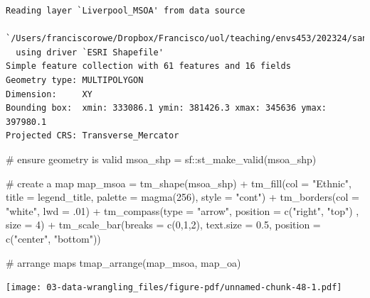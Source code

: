 \documentclass[
  letterpaper,
  DIV=11,
  numbers=noendperiod,
  oneside]{scrreprt}
\newenvironment{Shaded}{\begin{snugshade}}{\end{snugshade}}
\newcommand{\AttributeTok}[1]{\textcolor[rgb]{0.40,0.45,0.13}{#1}}
\newcommand{\CommentTok}[1]{\textcolor[rgb]{0.37,0.37,0.37}{#1}}
\newcommand{\DecValTok}[1]{\textcolor[rgb]{0.68,0.00,0.00}{#1}}
\newcommand{\FloatTok}[1]{\textcolor[rgb]{0.68,0.00,0.00}{#1}}
\newcommand{\FunctionTok}[1]{\textcolor[rgb]{0.28,0.35,0.67}{#1}}
\newcommand{\NormalTok}[1]{\textcolor[rgb]{0.00,0.23,0.31}{#1}}
\newcommand{\OtherTok}[1]{\textcolor[rgb]{0.00,0.23,0.31}{#1}}
\newcommand{\SpecialCharTok}[1]{\textcolor[rgb]{0.37,0.37,0.37}{#1}}
\newcommand{\StringTok}[1]{\textcolor[rgb]{0.13,0.47,0.30}{#1}}
\begin{document}
\begin{verbatim}
Reading layer `Liverpool_MSOA' from data source 
  `/Users/franciscorowe/Dropbox/Francisco/uol/teaching/envs453/202324/san/data/census/Liverpool_MSOA.shp' 
  using driver `ESRI Shapefile'
Simple feature collection with 61 features and 16 fields
Geometry type: MULTIPOLYGON
Dimension:     XY
Bounding box:  xmin: 333086.1 ymin: 381426.3 xmax: 345636 ymax: 397980.1
Projected CRS: Transverse_Mercator
\end{verbatim}

\begin{Shaded}
\begin{Highlighting}[]
\CommentTok{\# ensure geometry is valid}
\NormalTok{msoa\_shp }\OtherTok{=}\NormalTok{ sf}\SpecialCharTok{::}\FunctionTok{st\_make\_valid}\NormalTok{(msoa\_shp)}

\CommentTok{\# create a map}
\NormalTok{map\_msoa }\OtherTok{=} \FunctionTok{tm\_shape}\NormalTok{(msoa\_shp) }\SpecialCharTok{+}
  \FunctionTok{tm\_fill}\NormalTok{(}\AttributeTok{col =} \StringTok{"Ethnic"}\NormalTok{, }\AttributeTok{title =}\NormalTok{ legend\_title, }\AttributeTok{palette =} \FunctionTok{magma}\NormalTok{(}\DecValTok{256}\NormalTok{), }\AttributeTok{style =} \StringTok{"cont"}\NormalTok{) }\SpecialCharTok{+} 
  \FunctionTok{tm\_borders}\NormalTok{(}\AttributeTok{col =} \StringTok{"white"}\NormalTok{, }\AttributeTok{lwd =}\NormalTok{ .}\DecValTok{01}\NormalTok{)  }\SpecialCharTok{+} 
  \FunctionTok{tm\_compass}\NormalTok{(}\AttributeTok{type =} \StringTok{"arrow"}\NormalTok{, }\AttributeTok{position =} \FunctionTok{c}\NormalTok{(}\StringTok{"right"}\NormalTok{, }\StringTok{"top"}\NormalTok{) , }\AttributeTok{size =} \DecValTok{4}\NormalTok{) }\SpecialCharTok{+} 
  \FunctionTok{tm\_scale\_bar}\NormalTok{(}\AttributeTok{breaks =} \FunctionTok{c}\NormalTok{(}\DecValTok{0}\NormalTok{,}\DecValTok{1}\NormalTok{,}\DecValTok{2}\NormalTok{), }\AttributeTok{text.size =} \FloatTok{0.5}\NormalTok{, }\AttributeTok{position =}  \FunctionTok{c}\NormalTok{(}\StringTok{"center"}\NormalTok{, }\StringTok{"bottom"}\NormalTok{)) }

\CommentTok{\# arrange maps }
\FunctionTok{tmap\_arrange}\NormalTok{(map\_msoa, map\_oa) }
\end{Highlighting}
\end{Shaded}

\texttt{[image: 03-data-wrangling\_files/figure-pdf/unnamed-chunk-48-1.pdf]}

\end{document}

